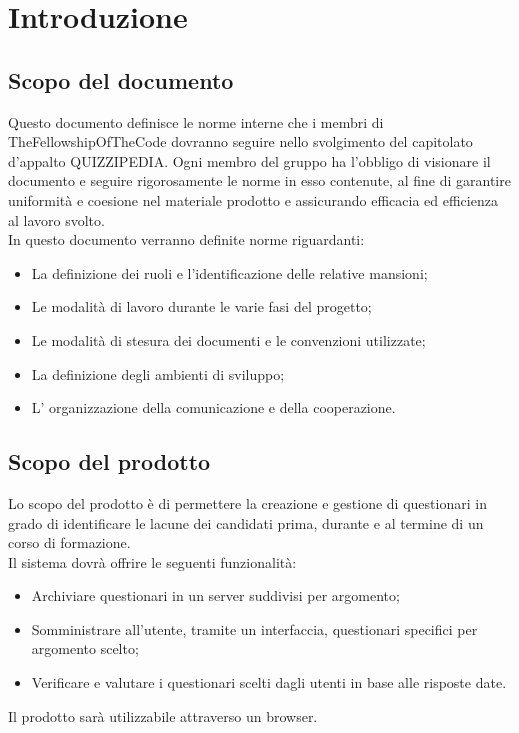 \section{Introduzione}

\subsection{Scopo del documento}
Questo documento definisce le norme interne che i membri di TheFellowshipOfTheCode dovranno seguire nello svolgimento del capitolato d'appalto QUIZZIPEDIA. Ogni membro del gruppo ha l'obbligo di visionare il documento e seguire rigorosamente le norme in esso contenute, al fine di garantire uniformità e coesione nel materiale prodotto e assicurando efficacia ed efficienza al lavoro svolto.
\\In questo documento verranno definite norme riguardanti:
\begin{itemize}
\item
La definizione dei ruoli e l'identificazione delle relative mansioni;	
\item
Le modalità di lavoro durante le varie fasi del progetto;
\item
Le modalità di stesura dei documenti e le convenzioni utilizzate;
\item
La definizione degli ambienti di sviluppo;
\item
L' organizzazione della comunicazione e della cooperazione.
\end{itemize}

\subsection{Scopo del prodotto}
Lo scopo del prodotto è di permettere la creazione e gestione di questionari in grado di identificare le lacune dei candidati prima, durante e al termine di un corso di formazione. 
\\Il sistema dovrà offrire le seguenti funzionalità:
\begin{itemize}
\item
Archiviare questionari in un server suddivisi per argomento;
\item
Somministrare all'utente, tramite un interfaccia, questionari specifici per argomento scelto;
\item
Verificare e valutare i questionari scelti dagli utenti in base alle risposte date.
\end{itemize}

Il prodotto sarà utilizzabile attraverso un browser.

